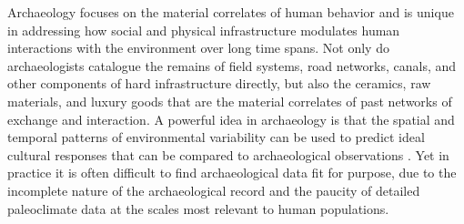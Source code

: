 \documentclass[10pt]{iopart}
\begin{document}
Archaeology focuses on the material correlates of human behavior and is unique in addressing how social and physical infrastructure modulates human interactions with the environment over long time spans. Not only do archaeologists catalogue the remains of field systems, road networks, canals, and other components of hard infrastructure directly, but also the ceramics, raw materials, and luxury goods that are the material correlates of past networks of exchange and interaction. A powerful idea in archaeology is that the spatial and temporal patterns of environmental variability can be used to predict ideal cultural responses that can be compared to archaeological observations \parencite{Halstead1989}. Yet in practice it is often difficult to find archaeological data fit for purpose, due to the incomplete nature of the archaeological record and the paucity of detailed paleoclimate data at the scales most relevant to human populations. 
\end{document}
